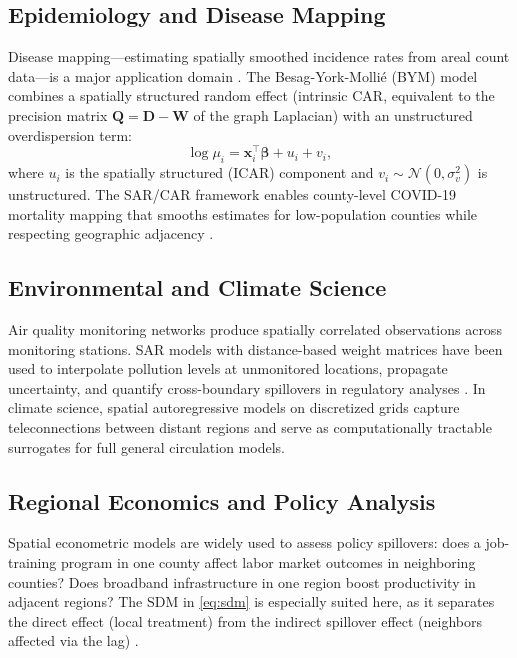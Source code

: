 \documentclass[conference]{IEEEtran}
\theoremstyle{definition}
\begin{document}
\subsection{Epidemiology and Disease Mapping}

Disease mapping---estimating spatially smoothed incidence rates from areal count data---is a major application domain \cite{lawson2013statistical}. The Besag-York-Mollié (BYM) model \cite{besag1991bayesian} combines a spatially structured random effect (intrinsic CAR, equivalent to the precision matrix $\mathbf{Q} = \mathbf{D} - \mathbf{W}$ of the graph Laplacian) with an unstructured overdispersion term:
\begin{equation}
\log\mu_i = \mathbf{x}_i^\top\bm{\beta} + u_i + v_i,
\end{equation}
where $u_i$ is the spatially structured (ICAR) component and $v_i \sim \mathcal{N}(0, \sigma_v^2)$ is unstructured. The SAR/CAR framework enables county-level COVID-19 mortality mapping that smooths estimates for low-population counties while respecting geographic adjacency \cite{besag1991bayesian}.

\subsection{Environmental and Climate Science}

Air quality monitoring networks produce spatially correlated observations across monitoring stations. SAR models with distance-based weight matrices have been used to interpolate pollution levels at unmonitored locations, propagate uncertainty, and quantify cross-boundary spillovers in regulatory analyses \cite{cressie1993statistics}. In climate science, spatial autoregressive models on discretized grids capture teleconnections between distant regions and serve as computationally tractable surrogates for full general circulation models.

\subsection{Regional Economics and Policy Analysis}

Spatial econometric models are widely used to assess policy spillovers: does a job-training program in one county affect labor market outcomes in neighboring counties? Does broadband infrastructure in one region boost productivity in adjacent regions? The SDM in \eqref{eq:sdm} is especially suited here, as it separates the direct effect (local treatment) from the indirect spillover effect (neighbors affected via the lag) \cite{lesage2009introduction,elhorst2010applied}.
\end{document}
